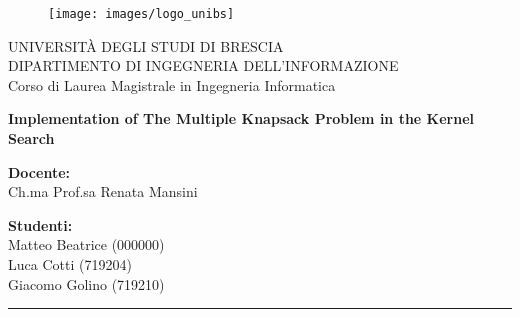 \begin{titlepage}
    \begin{figure}[H] %
        \centering
        \texttt{[image: images/logo\_unibs]}
    \end{figure}

    \begin{center}
        \LARGE{\uppercase{Università degli Studi di Brescia}}\\ %
        \vspace{5mm} %
        \large{\uppercase{Dipartimento di Ingegneria dell'informazione}}\\
        \vspace{5mm}
        \large{Corso di Laurea Magistrale in Ingegneria Informatica}\\
    \end{center}

    \vspace{10mm}

    \begin{center}
        \LARGE{\textbf{Implementation of The Multiple Knapsack Problem in the Kernel Search}}\\
    \end{center}

    \vspace{10mm}

    \begin{flushleft}
        \large
        \textbf{Docente:}\\
        Ch.ma Prof.sa Renata Mansini
    \end{flushleft}

    \begin{flushright}
        \large
        \textbf{Studenti:}\\
        Matteo Beatrice (000000)\\
        Luca Cotti (719204)\\
        Giacomo Golino (719210)
    \end{flushright}

    \vspace*{\fill} %

    \rule{0.8\textwidth}{0.6pt}\\ %
\end{titlepage}